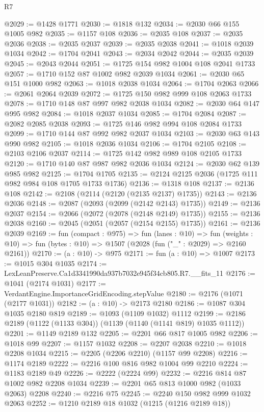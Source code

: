 \begin{lexlean}{R7}
\begin{coremodule}
@2029 := @1428 @1771
@2030 := @1818 @132
@2034 := @2030 @66 @155 @1005 @982
@2035 := @1157 @108
@2036 := @2035 @108
@2037 := @2035 @2036
@2038 := @2035 @2037
@2039 := @2035 @2038
@2041 := @1018 @2039 @1034
@2042 := @1704 @2041
@2043 := @2034 @2042
@2044 := @2035 @2039
@2045 := @2043 @2044
@2051 := @1725 @154 @982 @1004 @108 @2041 @1733
@2057 := @1710 @152 @87 @1002 @982 @2039 @1034
@2061 := @2030 @65 @151 @1000 @982
@2063 := @1018 @2038 @1034
@2064 := @1704 @2063
@2066 := @2061 @2064 @2039
@2072 := @1725 @150 @982 @999 @108 @2063 @1733
@2078 := @1710 @148 @87 @997 @982 @2038 @1034
@2082 := @2030 @64 @147 @995 @982
@2084 := @1018 @2037 @1034
@2085 := @1704 @2084
@2087 := @2082 @2085 @2038
@2093 := @1725 @146 @982 @994 @108 @2084 @1733
@2099 := @1710 @144 @87 @992 @982 @2037 @1034
@2103 := @2030 @63 @143 @990 @982
@2105 := @1018 @2036 @1034
@2106 := @1704 @2105
@2108 := @2103 @2106 @2037
@2114 := @1725 @142 @982 @989 @108 @2105 @1733
@2120 := @1710 @140 @87 @987 @982 @2036 @1034
@2124 := @2030 @62 @139 @985 @982
@2125 := @1704 @1705
@2135 := @2124 @2125 @2036 (@1725 @111 @982 @984 @108 @1705 @1733 @1736)
@2136 := @1318 @108
@2137 := @2136 @108
@2142 := @2108 (@2114 (@2120 (@2135 @2137) @1735))
@2143 := @2136 @2036
@2148 := @2087 (@2093 (@2099 (@2142 @2143) @1735))
@2149 := @2136 @2037
@2154 := @2066 (@2072 (@2078 (@2148 @2149) @1735))
@2155 := @2136 @2038
@2160 := @2045 (@2051 (@2057 (@2154 @2155) @1735))
@2161 := @2136 @2039
@2169 := fun (compact : @975) =>
  fun (lanes : @10) =>
  fun (weights : @10) => fun (bytes : @10) => @1507 (@2028 (fun ("_" : @2029) => @2160 @2161))
@2170 := (a : @10) -> @975
@2171 := fun (a : @10) => @1007
@2173 := @1015 @304 @1035
@2174 := LexLeanPreserve.Ca1d3341990da937b7032e945f34cb805.R7.__fits_11
@2176 := @1041 (@2174 @1031)
@2177 := VerdantEngine.ImportanceGridEncoding.stepValue
@2180 := @2176 (@1071 (@2177 @1031))
@2182 := (a : @10) -> @2173 @2180
@2186 := @1087 @304 @1035 @2180 @819
@2189 := @1093 (@1109 @1032) @1112
@2199 := @2186 @2189 (@1122 (@1133 @304)) (@1139 (@1140 (@1141 @819) @1035 @1112))
@2201 := @1149 @2189 @132
@2205 := @2201 @66 @817 @1005 @982
@2206 := @1018 @99
@2207 := @1157 @1032
@2208 := @2207 @2038
@2210 := @1018 @2208 @1034
@2215 := @2205 (@2206 @2210) (@1157 @99 @2208)
@2216 := @1174 @2189
@2222 := @2216 @100 @816 @982 @1004 @99 @2210
@2224 := @1183 @2189 @49
@2226 := @2222 (@2224 @99)
@2232 := @2216 @814 @87 @1002 @982 @2208 @1034
@2239 := @2201 @65 @813 @1000 @982 (@1033 @2063) @2208
@2240 := @2216 @75
@2245 := @2240 @150 @982 @999 @1032 @2063
@2252 := @1210 @2189 @18 @1032 (@1215 (@1216 @2189 @18))

\end{coremodule}
\end{lexlean}
